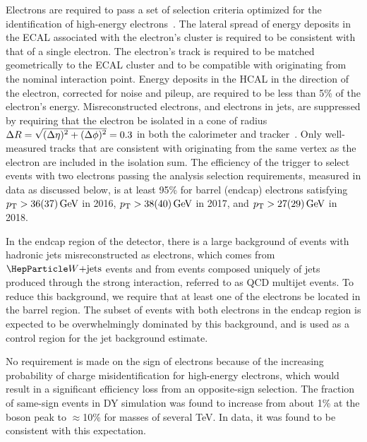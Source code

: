 \documentclass[11pt,twoside,a4paper,cmspaper,final,collab]{cms-tdr}
\begin{document}
Electrons are required to pass a set of selection criteria optimized for the identification of high-energy electrons~\cite{CMS-ele-paper}. The lateral spread of energy deposits in the ECAL associated with the electron's cluster is required to be consistent with that of a single electron. The electron's track is required to be matched geometrically to the ECAL cluster and to be compatible with originating from the nominal interaction point. Energy deposits in the HCAL in the direction of the electron, corrected for noise and pileup, are required to be less than 5\% of the electron's energy. Misreconstructed electrons, and electrons in jets, are suppressed by requiring that the electron be isolated in a cone of radius $\Delta R = \sqrt{\smash[b]{(\Delta\eta)^2+(\Delta\phi)^2}} = 0.3$ in both the calorimeter and tracker~\cite{Khachatryan:2016zqb}.
Only well-measured tracks that are consistent with originating from the same vertex as the electron are included in the isolation sum.
The efficiency of the trigger to select events with two electrons passing the analysis selection requirements, measured in data as discussed below, is at least 95\% for barrel (endcap) electrons satisfying $p_{\mathrm{T}} > 36 (37)\,\text{Ge\hspace{-.08em}V}$ in 2016, $p_{\mathrm{T}} > 38 (40)\,\text{Ge\hspace{-.08em}V}$ in 2017, and $p_{\mathrm{T}} > 27 (29)\,\text{Ge\hspace{-.08em}V}$ in 2018.

In the endcap region of the detector, there is a large background of events with hadronic jets misreconstructed as electrons, which comes from $\PW\text{+jets}$ events and from events composed uniquely of jets produced through the strong interaction, referred to as QCD multijet events. To reduce this background, we require that at least one of the electrons be located in the barrel region. The subset of events with both electrons in the endcap region is expected to be overwhelmingly dominated by this background, and is used as a control region for the jet background estimate. 

No requirement is made on the sign of electrons because of the increasing probability of charge misidentification for high-energy electrons, which would result in a significant efficiency loss from an opposite-sign selection. The fraction of same-sign events in DY simulation was found to increase from about 1\% at the \PZ boson peak to $\approx$10\% for masses of several TeV. In data, it was found to be consistent with this expectation.
\end{document}
